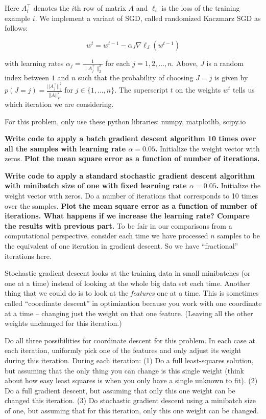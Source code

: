 Here $A_i^\top$ denotes the $i$th row of matrix $A$ and $\ell_i$ is the loss of the training example $i$. We implement a variant of SGD, called randomized Kaczmarz SGD as follows:

$$w^{t} = w^{t-1} - \alpha_J \nabla \ell_J(w^{t-1})$$

with learning rates $\alpha_j = \frac{1}{\|A_j^{\top}\|_2^2}$ for each
$j = 1, 2, \ldots, n$. Above, $J$ is a random index between $1$ and
$n$ such that the probability of choosing $J=j$ is given by $p(J=j) =
\frac{||A_{j}^{\top}||_2^2}{||A||_F^2}$ for $j \in \{1, \ldots
,n\}$. The superscript $t$ on the weights $w^t$ tells us which
iteration we are considering.  

For this problem, only use these python libraries: numpy, matplotlib, scipy.io

\begin{Parts}
\Part \textbf{Write code to apply a batch gradient descent algorithm
  10 times over all the samples with learning rate $\alpha = 0.05$.}
Initialize the weight vector with zeros. \textbf{Plot the mean square
  error as a function of number of iterations.} 


\Part \textbf{Write code to apply a standard stochastic gradient
  descent algorithm with minibatch size of one with fixed learning rate
  $\alpha = 0.05$.} Initialize the weight vector with
zeros. Do a number of iterations that corresponds to 10 times over the samples. \textbf{Plot the mean square error as a function of number of
  iterations. What happens if we increase the learning rate? Compare
  the results with previous part.} To be fair in our comparisons from
a computational perspective, consider each time we have processed $n$
samples to be the equivalent of one iteration in gradient descent. So
we have ``fractional'' iterations here. 



\Part Stochastic gradient descent looks at the training data in small
minibatches (or one at a time) instead of looking at the whole big
data set each time. Another thing that we could do is to look at the
{\em features} one at a time. This is sometimes called ``coordinate
descent'' in optimization because you work with one coordinate at a
time -- changing just the weight on that one feature. (Leaving all the
other weights unchanged for this iteration.) 

Do all three possibilities for coordinate descent for this
problem. In each case at each iteration, uniformly pick one of the
features and only adjust its weight during this iteration. During each
iteration: (1) Do a full least-squares solution, but assuming that the
only thing you can change is this single weight (think about how easy
least squares is when you only have a single unknown to fit). (2) Do a full gradient
descent, but assuming that only this one weight can be changed this
iteration. (3) Do stochastic gradient descent using a minibatch size
of one, but assuming that for this iteration, only this one weight can
be changed. 


\end{Parts}
